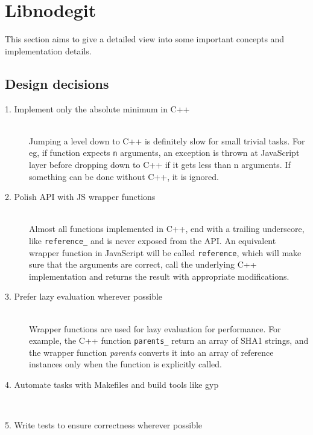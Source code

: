 \chapter{Libnodegit}

This section aims to give a detailed view into some important concepts and
implementation details.

\section{Design decisions}

\begin{description}

\item[1. Implement only the absolute minimum in C++] \hfill \\
  Jumping a level down to C++ is definitely slow for small trivial tasks. For
  eg, if function expects \texttt{n} arguments, an exception is thrown at
  JavaScript layer before dropping down to C++ if it gets less than n arguments.
  If something can be done without C++, it is ignored.

\item[2. Polish API with JS wrapper functions] \hfill \\
  Almost all functions implemented in C++, end with a trailing underscore, like
  \texttt{reference\_} and is never exposed from the API. An equivalent wrapper
  function in JavaScript will be called \texttt{reference}, which will make sure
  that the arguments are correct, call the underlying C++ implementation and
  returns the result with appropriate modifications.

\item[3. Prefer lazy evaluation wherever possible] \hfill \\
  Wrapper functions are used for lazy evaluation for performance. For example,
  the C++ function \texttt{parents\_} return an array of SHA1 strings, and the
  wrapper function \textit{parents} converts it into an array of reference
  instances only when the function is explicitly called.

\item[4. Automate tasks with Makefiles and build tools like gyp] \hfill \\
\item[5. Write tests to ensure correctness wherever possible] \hfill \\

\end{description}

